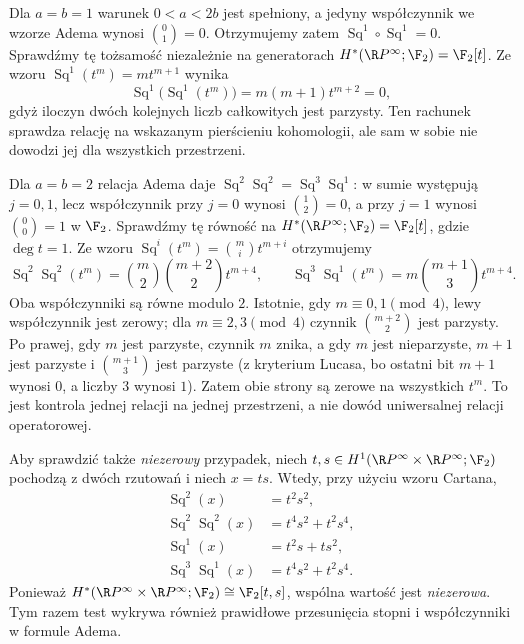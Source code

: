 \begin{przyklad}[Kontrola relacji Adema $\operatorname{Sq}^1\operatorname{Sq}^1=0$]
Dla $a=b=1$ warunek $0<a<2b$ jest spełniony,
a jedyny współczynnik we wzorze Adema wynosi
$\binom{0}{1}=0$. Otrzymujemy zatem
$\operatorname{Sq}^1\circ\operatorname{Sq}^1=0$.
Sprawdźmy tę tożsamość niezależnie na generatorach
$H^*(\R P^\infty;\F_2)=\F_2[t]$. Ze wzoru
$\operatorname{Sq}^1(t^m)=m t^{m+1}$ wynika
\[
\operatorname{Sq}^1\bigl(\operatorname{Sq}^1(t^m)\bigr)
=m(m+1)t^{m+2}=0,
\]
gdyż iloczyn dwóch kolejnych liczb całkowitych jest
parzysty. Ten rachunek sprawdza relację na wskazanym
pierścieniu kohomologii, ale sam w sobie nie dowodzi
jej dla wszystkich przestrzeni.
\end{przyklad}

\begin{przyklad}
Dla $a=b=2$ relacja Adema daje
$\operatorname{Sq}^2\operatorname{Sq}^2
 =\operatorname{Sq}^3\operatorname{Sq}^1$:
w sumie występują $j=0,1$, lecz współczynnik przy
$j=0$ wynosi $\binom{1}{2}=0$, a przy $j=1$
wynosi $\binom{0}{0}=1$ w $\F_2$.
Sprawdźmy tę równość na $H^*(\R P^\infty;\F_2)
=\F_2[t]$, gdzie $\deg t=1$. Ze wzoru
$\operatorname{Sq}^i(t^m)=\binom mi t^{m+i}$
otrzymujemy
\[
\operatorname{Sq}^2\operatorname{Sq}^2(t^m)
=\binom m2\binom{m+2}2t^{m+4},\qquad
\operatorname{Sq}^3\operatorname{Sq}^1(t^m)
=m\binom{m+1}3t^{m+4}.
\]
Oba współczynniki są równe modulo $2$.
Istotnie, gdy $m\equiv0,1\pmod4$, lewy
współczynnik jest zerowy; dla $m\equiv2,3\pmod4$
czynnik $\binom{m+2}{2}$ jest parzysty. Po prawej,
gdy $m$ jest parzyste, czynnik $m$ znika, a gdy
$m$ jest nieparzyste, $m+1$ jest parzyste i
$\binom{m+1}{3}$ jest parzyste (z kryterium Lucasa,
bo ostatni bit $m+1$ wynosi $0$, a liczby $3$ wynosi $1$).
Zatem obie strony są zerowe na wszystkich $t^m$.
To jest kontrola jednej relacji na jednej przestrzeni,
a nie dowód uniwersalnej relacji operatorowej.

Aby sprawdzić także \emph{niezerowy} przypadek, niech
$t,s\in H^1(\R P^\infty\times\R P^\infty;\F_2)$
pochodzą z dwóch rzutowań i niech $x=ts$.
Wtedy, przy użyciu wzoru Cartana,
\[
\begin{aligned}
\operatorname{Sq}^2(x)&=t^2s^2,\\
\operatorname{Sq}^2\operatorname{Sq}^2(x)
 &=t^4s^2+t^2s^4,\\
\operatorname{Sq}^1(x)&=t^2s+ts^2,\\
\operatorname{Sq}^3\operatorname{Sq}^1(x)
 &=t^4s^2+t^2s^4.
\end{aligned}
\]
Ponieważ $H^*(\R P^\infty\times\R P^\infty;\F_2)
\cong\F_2[t,s]$, wspólna wartość jest \emph{niezerowa}.
Tym razem test wykrywa również prawidłowe
przesunięcia stopni i współczynniki w formule Adema.
\end{przyklad}


